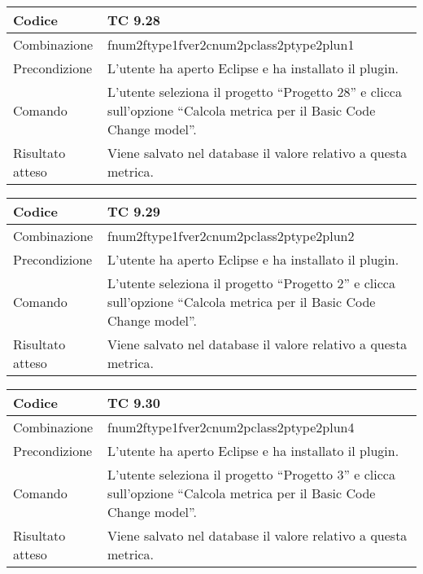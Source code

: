 \begin{table}[ht]
\begin{tabular}{|p{3cm}|p{9cm}|}
\hline
\cellcolor{lightgray}Codice				& TC 9.28								\\
\hline
\cellcolor{lightgray}Combinazione		& fnum2ftype1fver2cnum2pclass2ptype2plun1									\\
\hline
\cellcolor{lightgray}Precondizione		& L'utente ha aperto Eclipse e ha installato il plugin.		\\
\hline
\cellcolor{lightgray}Comando			& L'utente seleziona il progetto ``Progetto 28''  e clicca sull'opzione ``Calcola metrica per il Basic Code Change model''.	\\
\hline
\cellcolor{lightgray}Risultato atteso	& Viene salvato nel database il valore relativo a questa metrica.\\
\hline
\end{tabular}
\end{table}

\begin{table}[ht]
\begin{tabular}{|p{3cm}|p{9cm}|}
\hline
\cellcolor{lightgray}Codice				& TC 9.29								\\
\hline
\cellcolor{lightgray}Combinazione		& fnum2ftype1fver2cnum2pclass2ptype2plun2									\\
\hline
\cellcolor{lightgray}Precondizione		& L'utente ha aperto Eclipse e ha installato il plugin.		\\
\hline
\cellcolor{lightgray}Comando			& L'utente seleziona il progetto ``Progetto 2''  e clicca sull'opzione ``Calcola metrica per il Basic Code Change model''.	\\
\hline
\cellcolor{lightgray}Risultato atteso	& Viene salvato nel database il valore relativo a questa metrica.\\
\hline
\end{tabular}
\end{table}

\begin{table}[ht]
\begin{tabular}{|p{3cm}|p{9cm}|}
\hline
\cellcolor{lightgray}Codice				& TC 9.30								\\
\hline
\cellcolor{lightgray}Combinazione		& fnum2ftype1fver2cnum2pclass2ptype2plun4									\\
\hline
\cellcolor{lightgray}Precondizione		& L'utente ha aperto Eclipse e ha installato il plugin.		\\
\hline
\cellcolor{lightgray}Comando			& L'utente seleziona il progetto ``Progetto 3''  e clicca sull'opzione ``Calcola metrica per il Basic Code Change model''.	\\
\hline
\cellcolor{lightgray}Risultato atteso	& Viene salvato nel database il valore relativo a questa metrica.\\
\hline
\end{tabular}
\end{table}

